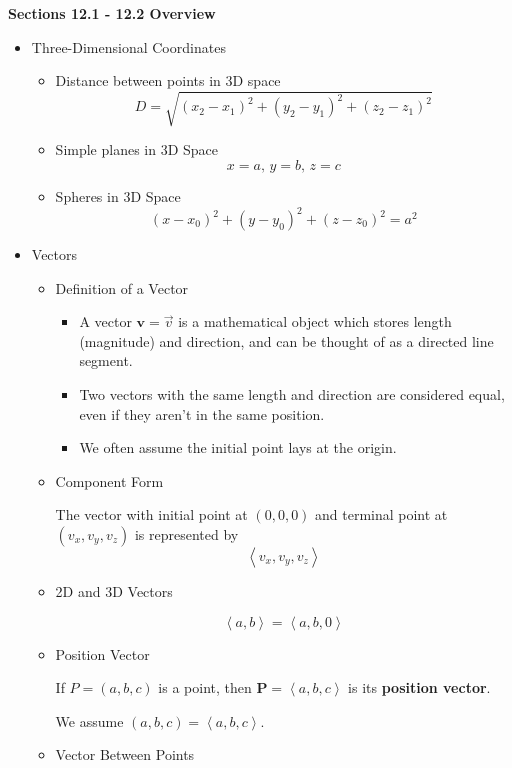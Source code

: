 \documentclass[12pt]{article}
\renewcommand{\vec}[1]{\mathbf{#1}}
\newcommand{\<}{\left<}
\renewcommand{\>}{\right>}
\begin{document}
\centerline{\bf Sections 12.1 - 12.2 Overview }

\begin{itemize}
\item Three-Dimensional Coordinates

  \begin{itemize}
  \item Distance between points in 3D space
    \[D = \sqrt{(x_2 - x_1)^2 + (y_2 - y_1)^2 + (z_2 - z_1)^2}\]
    
  \item Simple planes in 3D Space
    \[x=a,\, y=b,\, z=c\]
  
  \item Spheres in 3D Space
    \[(x-x_0)^2 + (y-y_0)^2 + (z-z_0)^2 = a^2\]
  \end{itemize}

\item Vectors
  \begin{itemize}
  \item Definition of a Vector
  
    \begin{itemize}
    \item A vector $\vec{v}=\overrightarrow{v}$ is a mathematical object which stores length (magnitude) and direction, and can be thought of as a directed line segment.
  
    \item Two vectors with the same length and direction are considered equal, even if they aren't in the same position. 

    \item We often assume the initial point lays at the origin.
    \end{itemize}
    
  \item Component Form
  
    The vector with initial point at $(0,0,0)$ and terminal point at $(v_x,v_y,v_z)$ is represented by \[\<v_x,v_y,v_z\>\]
    
  \item 2D and 3D Vectors
  
    \[\<a,b\>=\<a,b,0\>\]
    
  \item Position Vector
  
    If $P=(a,b,c)$ is a point, then $\vec{P}=\<a,b,c\>$ is its \textbf{position vector}. 

    We assume $(a,b,c)=\<a,b,c\>$.

  \item Vector Between Points
  

\end{itemize}
\end{itemize}
\end{document}
